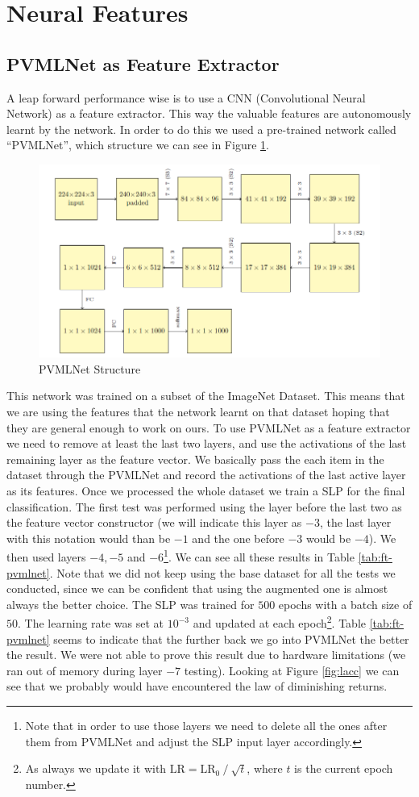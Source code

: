 \documentclass[10pt,a4paper]{report}
\begin{document}
\section{Neural Features} 
\subsection{PVMLNet as Feature Extractor}
A leap forward performance wise is to use a CNN (Convolutional Neural Network) as a feature extractor. This way the valuable features are autonomously learnt by the network. In order to do this we used a pre-trained network called \enquote{PVMLNet}, which structure we can see in Figure \ref{fig:pvmlnetstruct}.
\begin{figure}[!ht]
\centering
\includegraphics[width=0.75\linewidth]{pvmlnet.png}
\caption{PVMLNet Structure}
\label{fig:pvmlnetstruct}
\end{figure}
This network was trained on a subset of the ImageNet Dataset. This means that we are using the features that the network learnt on that dataset hoping that they are general enough to work on ours. To use PVMLNet as a feature extractor we need to remove at least the last two layers, and use the activations of the last remaining layer as the feature vector. We basically pass the each item in the dataset through the PVMLNet and record the activations of the last active layer as its features. Once we processed the whole dataset we train a SLP for the final classification. The first test was performed using the layer before the last two as the feature vector constructor (we will indicate this layer as $-3$, the last layer with this notation would than be $-1$ and the one before $-3$ would be $-4$). We then used layers $-4, -5$ and $-6$\footnote{Note that in order to use those layers we need to delete all the ones after them from PVMLNet and adjust the SLP input layer accordingly.}. We can see all these results in Table \ref{tab:ft-pvmlnet}. Note that we did not keep using the base dataset for all the tests we conducted, since we can be confident that using the augmented one is almost always the better choice. The SLP was trained for $500$ epochs with a batch size of $50$. The learning rate was set at $10^{-3}$ and updated at each epoch\footnote{As always we update it with $\text{LR}=\text{LR}_0 \mathbin{/} \sqrt{t}$, where $t$ is the current epoch number.}. Table \ref{tab:ft-pvmlnet} seems to indicate that the further back we go into PVMLNet the better the result. We were not able to prove this result due to hardware limitations (we ran out of memory during layer $-7$ testing). Looking at Figure \ref{fig:lacc} we can see that we probably would have encountered the law of diminishing returns.
\end{document}
